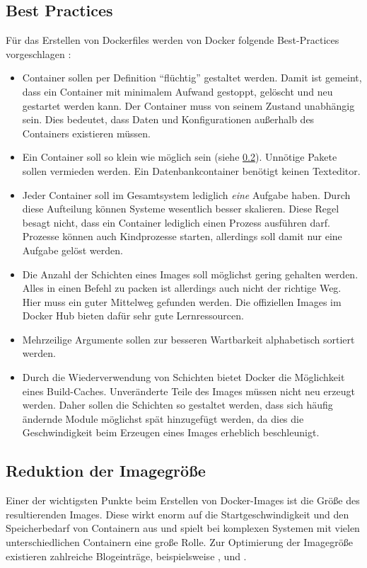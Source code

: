 \subsection{Best Practices}
\label{sec:dockerfile-best-practices}
Für das Erstellen von Dockerfiles werden von Docker folgende Best-Practices vorgeschlagen \autocite{docker-dockerfile-best-practices:online}:
\begin{itemize}
    \item Container sollen per Definition "`flüchtig"' gestaltet werden. Damit ist gemeint, dass ein Container mit minimalem Aufwand gestoppt, gelöscht und neu gestartet werden kann. Der Container muss von seinem Zustand unabhängig sein. Dies bedeutet, dass Daten und Konfigurationen außerhalb des Containers existieren müssen.
    \item Ein Container soll so klein wie möglich sein (siehe \cref{sec:minimize-imagesize}). Unnötige Pakete sollen vermieden werden. Ein Datenbankcontainer benötigt keinen Texteditor.
    \item Jeder Container soll im Gesamtsystem lediglich \emph{eine} Aufgabe haben. Durch diese Aufteilung können Systeme wesentlich besser skalieren. Diese Regel besagt nicht, dass ein Container lediglich einen Prozess ausführen darf. Prozesse können auch Kindprozesse starten, allerdings soll damit nur eine Aufgabe gelöst werden.
    \item Die Anzahl der Schichten eines Images soll möglichst gering gehalten werden. Alles in einen Befehl zu packen ist allerdings auch nicht der richtige Weg. Hier muss ein guter Mittelweg gefunden werden. Die offiziellen Images im Docker Hub bieten dafür sehr gute Lernressourcen.
    \item Mehrzeilige Argumente sollen zur besseren Wartbarkeit alphabetisch sortiert werden.
    \item Durch die Wiederverwendung von Schichten bietet Docker die Möglichkeit eines Build-Caches. Unveränderte Teile des Images müssen nicht neu erzeugt werden. Daher sollen die Schichten so gestaltet werden, dass sich häufig ändernde Module möglichst spät hinzugefügt werden, da dies die Geschwindigkeit beim Erzeugen eines Images erheblich beschleunigt.
\end{itemize}

\subsection{Reduktion der Imagegröße}
\label{sec:minimize-imagesize}
Einer der wichtigsten Punkte beim Erstellen von Docker-Images ist die Größe des resultierenden Images.
Diese wirkt enorm auf die Startgeschwindigkeit und den Speicherbedarf von Containern aus und spielt bei komplexen Systemen mit vielen unterschiedlichen Containern eine große Rolle.
Zur Optimierung der Imagegröße existieren zahlreiche Blogeinträge, beispielsweise \autocite{}, \autocite{} und \autocite{}.
